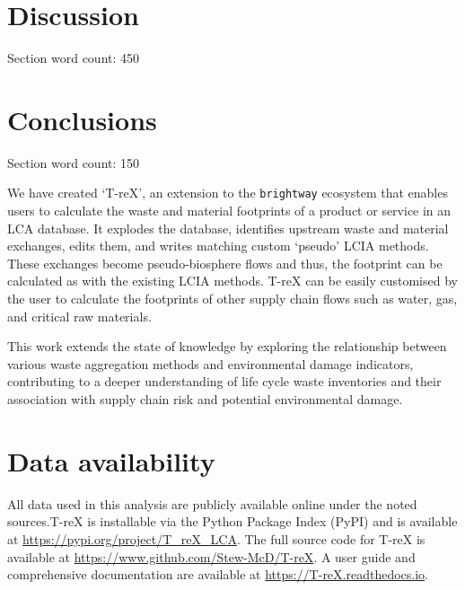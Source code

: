 \documentclass[review,3p,authoryear]{elsarticle}
\renewcommand{\texttt}[1]{{\ttfamily\small\nolinkurl{#1}}}
\newcommand{\cbox}[1]{
    \begin{tcolorbox}[hbox, colback=red!5!white, colframe=red!65!black, boxrule=0.25pt, boxsep=2pt, left=2pt, right=2pt, top=1pt, bottom=1pt]
        \small\sffamily #1
    \end{tcolorbox}
}
\begin{document}
\section{Discussion}
\label{sec:discussion}
\cbox{Section word count: 450}


\section{Conclusions}
\label{sec:conclusions}
\cbox{Section word count: 150}

We have created `T-reX', an extension to the \texttt{brightway} ecosystem that enables users to calculate the waste and material footprints of a product or service in an LCA database. It explodes the database, identifies upstream waste and material exchanges, edits them, and writes matching custom `pseudo' LCIA methods. These exchanges become pseudo-biosphere flows and thus, the footprint can be calculated as with the existing LCIA methods. T-reX can be easily customised by the user to calculate the footprints of other supply chain flows such as water, gas, and critical raw materials.

This work extends the state of knowledge by exploring the relationship between various waste aggregation methods and environmental damage indicators, contributing to a deeper understanding of life cycle waste inventories and their association with supply chain risk and potential environmental damage.


\section*{Data availability}
All data used in this analysis are publicly available online under the noted sources.T-reX is installable via the Python Package Index (PyPI) and is available at \url{https://pypi.org/project/T_reX_LCA}.
The full source code for T-reX is available at \url{https://www.github.com/Stew-McD/T-reX}.
A user guide and comprehensive documentation are available at \url{https://T-reX.readthedocs.io}.

\end{document}
